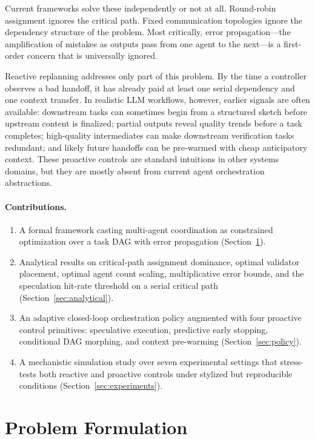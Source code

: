 \documentclass[10pt, twocolumn]{article}
\begin{document}
Current frameworks solve these independently or not at all. Round-robin assignment ignores the critical path. Fixed communication topologies ignore the dependency structure of the problem. Most critically, error propagation---the amplification of mistakes as outputs pass from one agent to the next---is a first-order concern that is universally ignored.

Reactive replanning addresses only part of this problem. By the time a controller observes a bad handoff, it has already paid at least one serial dependency and one context transfer. In realistic LLM workflows, however, earlier signals are often available: downstream tasks can sometimes begin from a structured sketch before upstream content is finalized; partial outputs reveal quality trends before a task completes; high-quality intermediates can make downstream verification tasks redundant; and likely future handoffs can be pre-warmed with cheap anticipatory context. These proactive controls are standard intuitions in other systems domains, but they are mostly absent from current agent orchestration abstractions.

\paragraph{Contributions.}
\begin{enumerate}
    \item A formal framework casting multi-agent coordination as constrained optimization over a task DAG with error propagation (Section~\ref{sec:formulation}).
    \item Analytical results on critical-path assignment dominance, optimal validator placement, optimal agent count scaling, multiplicative error bounds, and the speculation hit-rate threshold on a serial critical path (Section~\ref{sec:analytical}).
    \item An adaptive closed-loop orchestration policy augmented with four proactive control primitives: speculative execution, predictive early stopping, conditional DAG morphing, and context pre-warming (Section~\ref{sec:policy}).
    \item A mechanistic simulation study over seven experimental settings that stress-tests both reactive and proactive controls under stylized but reproducible conditions (Section~\ref{sec:experiments}).
\end{enumerate}

\section{Problem Formulation}
\label{sec:formulation}
\end{document}
